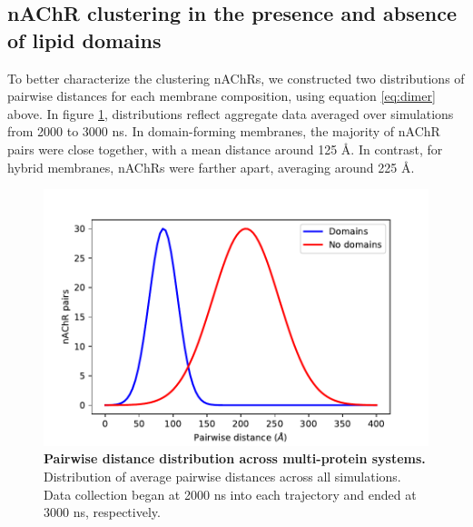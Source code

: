 






\subsection{nAChR clustering in the presence and absence of lipid domains} \label{sec:clustering}
To better characterize the clustering nAChRs, we constructed two distributions of pairwise distances for each membrane composition, using equation \ref{eq:dimer} above. In figure \ref{fig:Figure6}, distributions reflect aggregate data averaged over simulations from 2000 to 3000 ns. In domain-forming membranes, the majority of nAChR pairs were close together, with a mean distance around 125 {\AA}. In contrast, for hybrid membranes, nAChRs were farther apart, averaging around 225 {\AA}.  


\begin{figure}[h]
\centering
\includegraphics[width=\linewidth,trim={0cm 0cm 0cm 0cm}]{Figure2n}
\caption[Pairwise distance distribution across multi-protein systems.] {{\bf Pairwise distance distribution across multi-protein systems.} Distribution of average pairwise distances across all simulations. Data collection began at 2000 ns into each trajectory and ended at 3000 ns, respectively. }
\label{fig:Figure6}
\end{figure}


